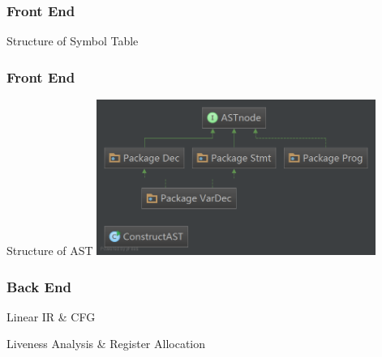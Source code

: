 \documentclass{beamer}
\begin{document}
	\begin{frame}
		\frametitle{Front End}
		\begin{block}{Structure of Symbol Table}
		
		\end{block}
	\end{frame}

	\begin{frame}
		\frametitle{Front End}
		\begin{block}{Structure of AST}
		\centering
		\includegraphics[height = 2in]{AST.png}
		\end{block}
	\end{frame}
	
	\begin{frame}
		\frametitle{Back End}
		\begin{block}{Linear IR \& CFG}
		\end{block}
	\end{frame}

	\begin{frame}[fragile]
		\begin{block}{Liveness Analysis \& Register Allocation}
		\end{block}
	\end{frame}
\end{document}
